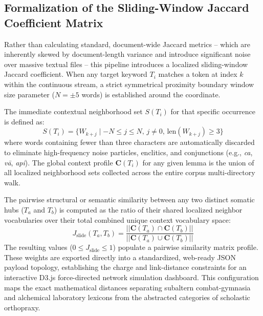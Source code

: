 \documentclass[11pt,twoside,letterpaper]{article}
\begin{document}
\subsection{Formalization of the Sliding-Window Jaccard Coefficient Matrix}
Rather than calculating standard, document-wide Jaccard metrics -- which are inherently skewed by document-length variance and introduce significant noise over massive textual files -- this pipeline introduces a localized sliding-window Jaccard coefficient. When any target keyword $T_i$ matches a token at index $k$ within the continuous stream, a strict symmetrical proximity boundary window size parameter ($N = \pm 5$ words) is established around the coordinate.

The immediate contextual neighborhood set $S(T_i)$ for that specific occurrence is defined as:
\begin{equation}
S(T_i) = \{W_{k+j} \mid -N \le j \le N, \, j \neq 0, \, \text{len}(W_{k+j}) \ge 3\}
\end{equation}
where words containing fewer than three characters are automatically discarded to eliminate high-frequency noise particles, enclitics, and conjunctions (e.g., \textit{ca}, \textit{vā}, \textit{api}). The global context profile $\mathbf{C}(T_i)$ for any given lemma is the union of all localized neighborhood sets collected across the entire corpus multi-directory walk.

The pairwise structural or semantic similarity between any two distinct somatic hubs ($T_a$ and $T_b$) is computed as the ratio of their shared localized neighbor vocabularies over their total combined unique context vocabulary space:
\begin{equation}
J_{\text{slide}}(T_a, T_b) = \frac{||\mathbf{C}(T_a) \cap \mathbf{C}(T_b)||}{||\mathbf{C}(T_a) \cup \mathbf{C}(T_b)||}
\end{equation}
The resulting values ($0 \le J_{\text{slide}} \le 1$) populate a pairwise similarity matrix profile. These weights are exported directly into a standardized, web-ready JSON payload topology, establishing the charge and link-distance constraints for an interactive D3.js force-directed network simulation dashboard. This configuration maps the exact mathematical distances separating subaltern combat-gymnasia and alchemical laboratory lexicons from the abstracted categories of scholastic orthopraxy.
\end{document}
